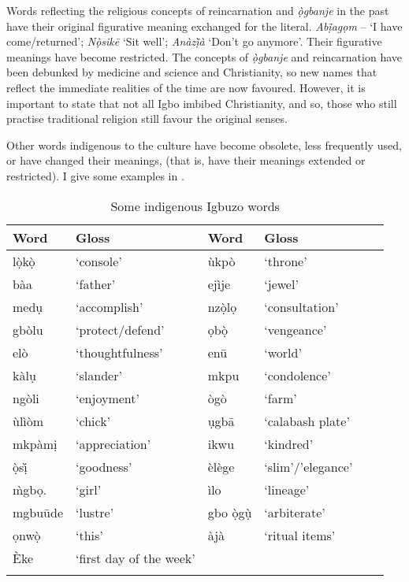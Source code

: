 \documentclass[output=paper]{langscibook}
\begin{document}
Words reflecting the religious concepts of reincarnation and \textit{ọ̀gbanje} in the past have their original figurative meaning exchanged for the literal. \textit{Abị̄agọm }-- ‘I have come/returned’; \textit{Nọ̀sikē}  ‘Sit well’; \textit{Anàzị̀à}  ‘Don’t go anymore’. Their figurative meanings have become restricted. The concepts of \textit{ọ̀gbanje} and reincarnation have been debunked by medicine and science and Christianity, so new names that reflect the immediate realities of the time are now favoured. However, it is important to state that not all Igbo imbibed Christianity, and so, those who still practise traditional religion still favour the original senses.
 
Other words indigenous to the culture have become obsolete, less frequently used, or have changed their meanings, (that is, have their meanings extended or restricted). I give some examples in .

\begin{table}
\caption{\label{tab:owaleke:4.3}Some indigenous Igbuzo words}
\begin{tabular}{llllll}
\lsptoprule
Word     & Gloss            & Word     & Gloss\\\midrule
lọ̀kọ̀    & ‘console’        & ùkpò    & ‘throne’         \\
bàa     & ‘father’         & ejìje   & ‘jewel’          \\
medụ    & ‘accomplish’     & nzọ̀lọ   & ‘consultation’   \\
gbòlu   & ‘protect/defend’ & ọbọ̀     & ‘vengeance’      \\
elò     & ‘thoughtfulness’ & enū     & ‘world’          \\
kàlụ    & ‘slander’        & mkpu    & ‘condolence’     \\
ngòli   & ‘enjoyment’      & ògò     & ‘farm’           \\
ùlìòm   & ‘chick’          & ụgbā    & ‘calabash plate’ \\
mkpàmị  & ‘appreciation’   & ikwu    & ‘kindred’        \\
ọ̀sị̀       & ‘goodness’  & èlège     & ‘slim’/’elegance’       \\
m̀gbọ.     & ‘girl’     & ìlo       & ‘lineage’               \\      
mgbuūde   & ‘lustre’   & gbo ọ̀gụ̀   & ‘arbiterate’            \\ 
ọnwọ̀      & ‘this’     & àjà       & ‘ritual items’          \\ 
Èke       & ‘first day of the week’ \\                               
\lspbottomrule
\end{tabular}
\end{table}
\end{document}
